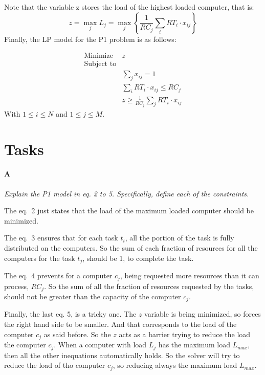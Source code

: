 \documentclass[11pt,a4paper,twocolumn]{article}
\begin{document}
Note that the variable z stores the load of the highest loaded computer, that 
is:
%
\begin{equation}
  z = \max_j L_j
  = \max_j \left\{ \frac{1}{RC_j} \sum_{i}{RT_i \cdot x_{ij}} \right\}
\end{equation}
%
Finally, the LP model for the P1 problem is as follows:

\noindent
\begin{minipage}{\columnwidth}
\begin{align}
\text{Minimize } & z\\
\text{Subject to}& \nonumber \\
& \sum_j x_{ij} = 1 \\
& \sum_i RT_i \cdot x_{ij} \le RC_j \\
& z \ge \frac{1}{RC_j} \sum_{j}{RT_i \cdot x_{ij}}
\end{align}
With $1 \le i \le N$ and $1 \le j \le M$.
\end{minipage}
\rm

\section*{Tasks}
\paragraph*{A}
\textsl{Explain the P1 model in eq. 2 to 5. Specifically, define each of the
constraints.}

The eq.~2 just states that the load of the maximum loaded computer should be 
minimized.

The eq.~3 ensures that for each task $t_i$, all the portion of the task is fully 
distributed on the computers. So the sum of each fraction of resources for all 
the computers for the task $t_j$, should be 1, to complete the task.

The eq.~4 prevents for a computer $c_j$, being requested more resources than it 
can process, $RC_j$. So the sum of all the fraction of resources requested by 
the tasks, should not be greater than the capacity of the computer $c_j$.

Finally, the last eq. 5, is a tricky one. The $z$ variable is being minimized, 
so forces the right hand side to be smaller. And that corresponds to the load of 
the computer $c_j$ as said before. So the $z$ acts as a barrier trying to reduce 
the load the computer $c_j$. When a computer with load $L_j$ has the maximum 
load $L_{max}$, then all the other inequations automatically holds. So the 
solver will try to reduce the load of tho computer $c_j$, so reducing always the 
maximum load $L_{max}$.
\end{document}

